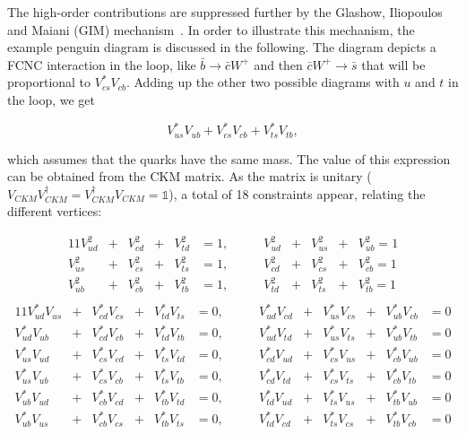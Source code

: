 The high-order contributions are suppressed further by the Glashow, Iliopoulos and Maiani (GIM) mechanism~\cite{PhysRevD.2.1285}. In order to illustrate this mechanism, the example penguin diagram is discussed in the following. The diagram depicts a FCNC interaction in the loop, like $\bar{b}\to\bar{c}W^+$ and then $\bar{c}W^+\to\bar{s}$ that will be proportional to $V_{cs}^*V_{cb}$. Adding up the other two possible diagrams with $u$ and $t$ in the loop, we get

\begin{equation}
    V_{us}^*V_{ub}+V_{cs}^*V_{cb}+V_{ts}^*V_{tb},
    \label{Theory_eq:examplefeymanVs}
\end{equation}

which assumes that the quarks have the same mass. The value of this expression can be obtained from the CKM matrix. As the matrix is unitary ($V_{CKM}V_{CKM}^\dagger=V_{CKM}^\dagger V_{CKM}=\mathds{1}$), a total of 18 constraints appear, relating the different vertices: 

\begin{alignat*}{11}
    V_{ud}^2&+&V_{cd}^2&+&V_{td}^2&=1,   &\qquad V_{ud}^2&+&V_{us}^2&+&V_{ub}^2=1  \\
    V_{us}^2&+&V_{cs}^2&+&V_{ts}^2&=1,   &\qquad V_{cd}^2&+&V_{cs}^2&+&V_{cb}^2=1 \\
    V_{ub}^2&+&V_{cb}^2&+&V_{tb}^2&=1,   &\qquad V_{td}^2&+&V_{ts}^2&+&V_{tb}^2=1 \\
\end{alignat*}
\vspace{-1em}
\begin{alignat}{11}
    V_{ud}^*V_{us}&+&V_{cd}^*V_{cs}&+&V_{td}^*V_{ts}&=0,   &\qquad V_{ud}^*V_{cd}&+&V_{us}^*V_{cs}&+&V_{ub}^*V_{cb}&=0 \nonumber \\
    V_{ud}^*V_{ub}&+&V_{cd}^*V_{cb}&+&V_{td}^*V_{tb}&=0,   &\qquad V_{ud}^*V_{td}&+&V_{us}^*V_{ts}&+&V_{ub}^*V_{tb}&=0 \\ 
    V_{us}^*V_{ud}&+&V_{cs}^*V_{cd}&+&V_{ts}^*V_{td}&=0,   &\qquad V_{cd}^*V_{ud}&+&V_{cs}^*V_{us}&+&V_{cb}^*V_{ub}&=0 \nonumber\\
    V_{us}^*V_{ub}&+&V_{cs}^*V_{cb}&+&V_{ts}^*V_{tb}&=0,   &\qquad V_{cd}^*V_{td}&+&V_{cs}^*V_{ts}&+&V_{cb}^*V_{tb}&=0 \nonumber\\
    V_{ub}^*V_{ud}&+&V_{cb}^*V_{cd}&+&V_{tb}^*V_{td}&=0,   &\qquad V_{td}^*V_{ud}&+&V_{ts}^*V_{us}&+&V_{tb}^*V_{ub}&=0 \nonumber\\
    V_{ub}^*V_{us}&+&V_{cb}^*V_{cs}&+&V_{tb}^*V_{ts}&=0,   &\qquad V_{td}^*V_{cd}&+&V_{ts}^*V_{cs}&+&V_{tb}^*V_{cb}&=0 \nonumber
\end{alignat}


